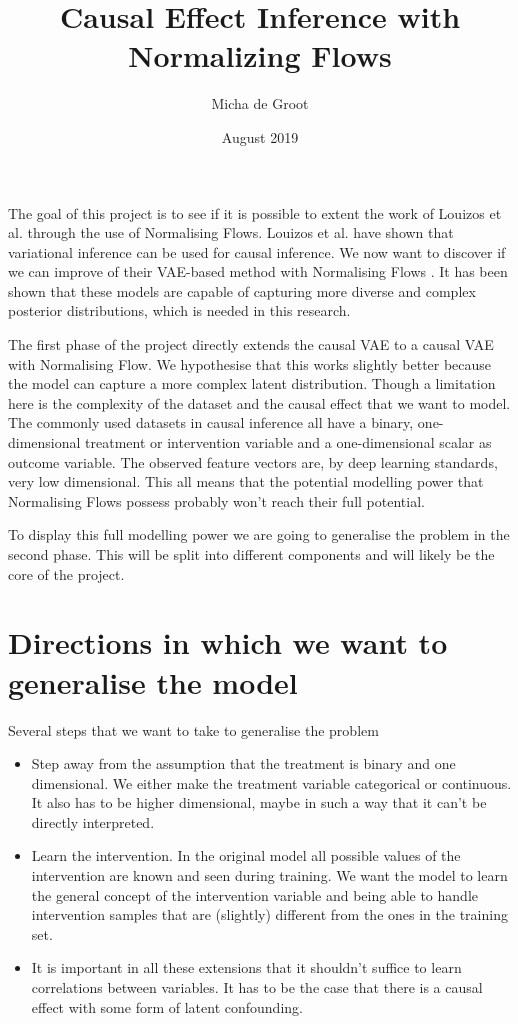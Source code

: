 \documentclass{article}
\title{Causal Effect Inference with Normalizing Flows}
\author{Micha de Groot}
\date{August 2019}
\begin{document}
\maketitle

\noindent
The goal of this project is to see if it is possible to extent the work of Louizos et al. \cite{louizos2017causal} through the use of Normalising Flows. Louizos et al. have shown that variational inference can be used for causal inference. We now want to discover if we can improve of their VAE-based \cite{kingma2013auto} method with Normalising Flows \cite{rezende2016variational}\cite{berg2018sylvester}\cite{dinh2016density}. It has been shown that these models are capable of capturing more diverse and complex posterior distributions, which is needed in this research.

The first phase of the project directly extends the causal VAE to a causal VAE with Normalising Flow. We hypothesise that this works slightly better because the model can capture a more complex latent distribution. Though a limitation here is the complexity of the dataset and the causal effect that we want to model. The commonly used datasets in causal inference all have a binary, one-dimensional treatment or intervention variable and a one-dimensional scalar as outcome variable. The observed feature vectors are, by deep learning standards, very low dimensional. This all means that the potential modelling power that Normalising Flows possess probably won't reach their full potential. 

To display this full modelling power we are going to generalise the problem in the second phase. This will be split into different components and will likely be the core of the project.

\section{Directions in which we want to generalise the model}
Several steps that we want to take to generalise the problem
\begin{itemize}
    \item Step away from the assumption that the treatment is binary and one dimensional. We either make the treatment variable categorical or continuous. It also has to be higher dimensional, maybe in such a way that it can't be directly interpreted.
    \item Learn the intervention. In the original model all possible values of the intervention are known and seen during training. We want the model to learn the general concept of the intervention variable and being able to handle intervention samples that are (slightly) different from the ones in the training set.
    \item It is important in all these extensions that it shouldn't suffice to learn correlations between variables. It has to be the case that there is a causal effect with some form of latent confounding.
\end{itemize}
\end{document}
